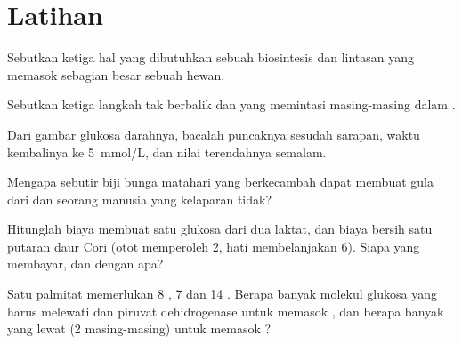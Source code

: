 \section{Latihan}

\begin{exercise}[$\star$]\label{exo:b1:biosyntheses-integration:1}
Sebutkan ketiga hal yang dibutuhkan sebuah biosintesis dan lintasan
yang memasok sebagian besar  sebuah  hewan.
\end{exercise}

\begin{exercise}[$\star$]\label{exo:b1:biosyntheses-integration:2}
Sebutkan ketiga langkah tak berbalik  dan  yang
memintasi masing-masing dalam .
\end{exercise}

\begin{exercise}[$\star$]\label{exo:b1:biosyntheses-integration:3}
Dari gambar glukosa darahnya, bacalah puncaknya sesudah sarapan, waktu
kembalinya ke \qty{5}{mmol/L}, dan nilai terendahnya semalam.
\end{exercise}

\begin{exercise}[$\star$]\label{exo:b1:biosyntheses-integration:4}
Mengapa sebutir biji bunga matahari yang berkecambah dapat membuat gula
dari  dan seorang manusia yang kelaparan tidak?
\end{exercise}

\begin{exercise}[$\star\star$]\label{exo:b1:biosyntheses-integration:5}
Hitunglah biaya  membuat satu glukosa dari dua laktat, dan biaya
bersih satu putaran daur Cori (otot memperoleh 2, hati membelanjakan
6). Siapa yang membayar, dan dengan apa?
\end{exercise}

\begin{exercise}[$\star\star$]\label{exo:b1:biosyntheses-integration:6}
Satu palmitat memerlukan 8 , 7  dan 14 . Berapa
banyak molekul glukosa yang harus melewati  dan piruvat
dehidrogenase untuk memasok , dan berapa banyak yang
lewat  (2  masing-masing) untuk memasok
?
\end{exercise}

